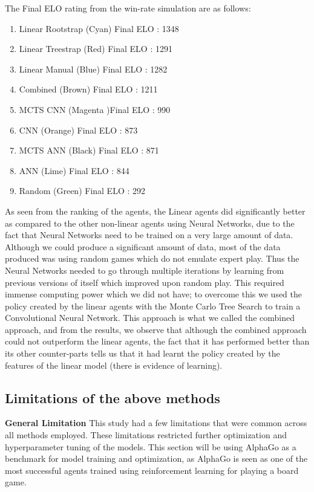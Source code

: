 \documentclass[a4paper,12pt,table]{article}
\begin{document}
The Final ELO rating from the win-rate simulation are as follows:

\begin{enumerate}
    \item Linear Rootstrap (Cyan) Final ELO : 1348
    \item Linear Treestrap (Red) Final ELO : 1291
    \item Linear Manual (Blue) Final ELO : 1282
    \item Combined (Brown) Final ELO : 1211
    \item MCTS CNN (Magenta )Final ELO : 990
    \item CNN (Orange) Final ELO : 873
    \item MCTS ANN (Black) Final ELO : 871
    \item ANN (Lime) Final ELO : 844
    \item Random (Green) Final ELO : 292
\end{enumerate}

As seen from the ranking of the agents, the Linear agents did significantly better as compared to the other non-linear agents using Neural Networks, due to the fact that Neural Networks need to be trained on a very large amount of data. Although we could produce a significant amount of data, most of the data produced was using random games which do not emulate expert play. Thus the Neural Networks needed to go through multiple iterations by learning from previous versions of itself which improved upon random play. This required immense computing power which we did not have; to overcome this we used the policy created by the linear agents with the Monte Carlo Tree Search to train a Convolutional Neural Network. This approach is what we called the combined approach, and from the results, we observe that although the combined approach could not outperform the linear agents, the fact that it has performed better than its other counter-parts tells us that it had learnt the policy created by the features of the linear model (there is evidence of learning). \par

\subsection{Limitations of the above methods}

\textbf{General Limitation}
\newline
This study had a few limitations that were common across all methods employed. These limitations restricted further optimization and hyperparameter tuning of the models. This section will be using AlphaGo as a benchmark for model training and optimization, as AlphaGo is seen as one of the most successful agents trained using reinforcement learning for playing a board game. \par
\end{document}
